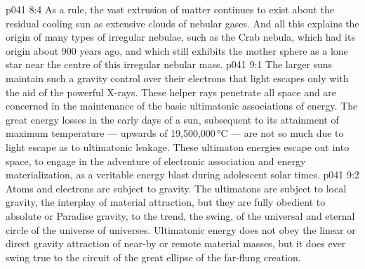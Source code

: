 \vs p041 8:4 As a rule, the vast extrusion of matter continues to exist about the residual cooling sun as extensive clouds of nebular gases. And all this explains the origin of many types of irregular nebulae, such as the Crab nebula, which had its origin about 900 years ago, and which still exhibits the mother sphere as a lone star near the centre of this irregular nebular mass.
\vs p041 9:1 The larger suns maintain such a gravity control over their electrons that light escapes only with the aid of the powerful X\hyp{}rays. These helper rays penetrate all space and are concerned in the maintenance of the basic ultimatonic associations of energy. The great energy losses in the early days of a sun, subsequent to its attainment of maximum temperature --- upwards of 19,500,000\,°C --- are not so much due to light escape as to ultimatonic leakage. These ultimaton energies escape out into space, to engage in the adventure of electronic association and energy materialization, as a veritable energy blast during adolescent solar times.
\vs p041 9:2 \pc Atoms and electrons are subject to gravity. The ultimatons are  subject to local gravity, the interplay of material attraction, but they are fully obedient to absolute or Paradise gravity, to the trend, the swing, of the universal and eternal circle of the universe of universes. Ultimatonic energy does not obey the linear or direct gravity attraction of near\hyp{}by or remote material masses, but it does ever swing true to the circuit of the great ellipse of the far\hyp{}flung creation.
